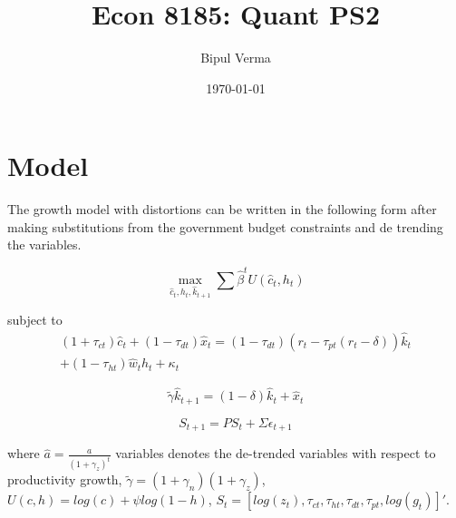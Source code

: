\documentclass[12pt]{article}
\begin{document}

\title{Econ 8185: Quant PS2}
\author{Bipul Verma}
\date{\today}
\maketitle


\vspace{8cm}



\newpage

\section{Model}
The growth model with distortions can be written in the following form after making substitutions from the government budget constraints and de trending the variables.

$$\max_{\hat{c}_t, h_t , \hat{k}_{t+1}} \sum \hat{\beta}^t U(\hat{c}_t, h_t)$$

subject to 
\begin{multline*}
(1+\tau_{ct})\hat{c}_t + (1-\tau_{dt})\hat{x}_t = (1-\tau_{dt})(r_t -\tau_{pt}(r_t -\delta))\hat{k}_t \\                                                 + (1-\tau_{ht})\hat{w}_th_t + \kappa_t
\end{multline*}

$$\tilde{\gamma} \hat{k}_{t+1} = (1-\delta)\hat{k}_t + \hat{x}_t$$

$$S_{t+1} = PS_t + \Sigma \epsilon_{t+1}$$ 

where $\hat{a} = \frac{a}{(1+\gamma_z)^t}$ variables denotes the de-trended variables with respect to productivity growth, $\tilde{\gamma} = (1+\gamma_n)(1+\gamma_z)$, $U(c, h) = log(c) + \psi log(1-h)$, $S_t = [log(z_t), \tau_{ct}, \tau_{ht}, \tau_{dt}, \tau_{pt}, log(g_t)]'$. 
\end{document}
